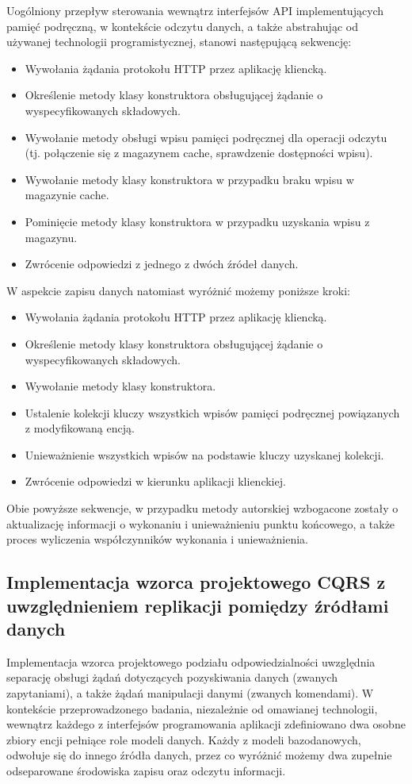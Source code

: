 Uogólniony przepływ sterowania wewnątrz interfejsów API implementujących pamięć podręczną, w kontekście odczytu danych, a także abstrahując od używanej technologii programistycznej, stanowi następującą sekwencję:

\begin{itemize}
    \item Wywołania żądania protokołu HTTP przez aplikację kliencką.
    \item Określenie metody klasy konstruktora obsługującej żądanie o wyspecyfikowanych składowych.
    \item Wywołanie metody obsługi wpisu pamięci podręcznej dla operacji odczytu (tj. połączenie się z magazynem cache, sprawdzenie dostępności wpisu).
    \item Wywołanie metody klasy konstruktora w przypadku braku wpisu w magazynie cache.
    \item Pominięcie metody klasy konstruktora w przypadku uzyskania wpisu z magazynu.
    \item Zwrócenie odpowiedzi z jednego z dwóch źródeł danych.
\end{itemize}

W aspekcie zapisu danych natomiast wyróżnić możemy poniższe kroki:

\begin{itemize}
    \item Wywołania żądania protokołu HTTP przez aplikację kliencką.
    \item Określenie metody klasy konstruktora obsługującej żądanie o wyspecyfikowanych składowych.
    \item Wywołanie metody klasy konstruktora.
    \item Ustalenie kolekcji kluczy wszystkich wpisów pamięci podręcznej powiązanych z modyfikowaną encją.
    \item Unieważnienie wszystkich wpisów na podstawie kluczy uzyskanej kolekcji.
    \item Zwrócenie odpowiedzi w kierunku aplikacji klienckiej.
\end{itemize}

Obie powyższe sekwencje, w przypadku metody autorskiej wzbogacone zostały o aktualizację informacji o wykonaniu i unieważnieniu punktu końcowego, a także proces wyliczenia współczynników wykonania i unieważnienia. 
\subsection*{Implementacja wzorca projektowego CQRS z uwzględnieniem replikacji pomiędzy źródłami danych}
\label{sec:implementacja-cqrs-i-replikacji}
Implementacja wzorca projektowego podziału odpowiedzialności uwzględnia separację obsługi żądań dotyczących pozyskiwania danych (zwanych zapytaniami), a także żądań manipulacji danymi (zwanych komendami). W kontekście przeprowadzonego badania, niezależnie od omawianej technologii, wewnątrz każdego z interfejsów programowania aplikacji zdefiniowano dwa osobne zbiory encji pełniące role modeli danych. Każdy z modeli bazodanowych, odwołuje się do innego źródła danych, przez co wyróżnić możemy dwa zupełnie odseparowane środowiska zapisu oraz odczytu informacji.

